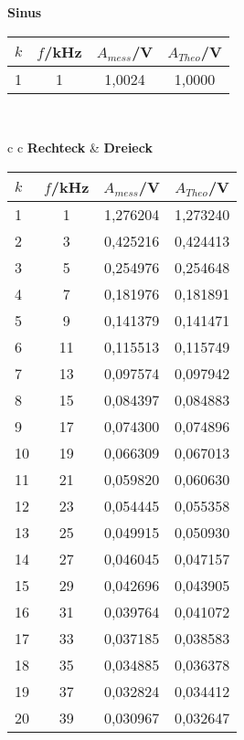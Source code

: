 \begin{center}
    \textbf{Sinus}\\[0,2cm]
    \begin{tabular}{l | c | c c}
        $k$ & $f$/kHz &   $A_{mess}$/V & $A_{Theo}$/V \\
        \hline
        1 & 1 &  1,0024 & 1,0000 \\
    \end{tabular}\\[0,5cm]
    \begin{tabular}{c c}
        \textbf{Rechteck} & \textbf{Dreieck} \\[0,2cm]
        \begin{tabular}{l | c | c c}
            $k$ & $f$/kHz  &   $A_{mess}$/V & $A_{Theo}$/V \\
            \hline
            1  &       1 &  1,276204 &  1,273240 \\
            2  &       3 &  0,425216 &  0,424413 \\
            3  &       5 &  0,254976 &  0,254648 \\
            4  &       7 &  0,181976 &  0,181891 \\
            5  &       9 &  0,141379 &  0,141471 \\
            6  &      11 &  0,115513 &  0,115749 \\
            7  &      13 &  0,097574 &  0,097942 \\
            8  &      15 &  0,084397 &  0,084883 \\
            9  &      17 &  0,074300 &  0,074896 \\
            10 &      19 &  0,066309 &  0,067013 \\
            11 &      21 &  0,059820 &  0,060630 \\
            12 &      23 &  0,054445 &  0,055358 \\
            13 &      25 &  0,049915 &  0,050930 \\
            14 &      27 &  0,046045 &  0,047157 \\
            15 &      29 &  0,042696 &  0,043905 \\
            16 &      31 &  0,039764 &  0,041072 \\
            17 &      33 &  0,037185 &  0,038583 \\
            18 &      35 &  0,034885 &  0,036378 \\
            19 &      37 &  0,032824 &  0,034412 \\
            20 &      39 &  0,030967 &  0,032647 \\

\end{tabular}
\end{tabular}
\end{center}
